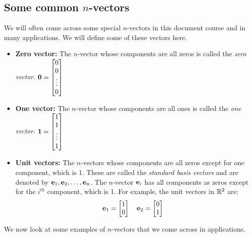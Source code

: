 \subsection{Some common $n$-vectors}
We will often come across some special $n$-vectors in this document course and in many applications. We will define some of these vectors here.
\begin{itemize}
    \item \textbf{Zero vector:} The $n$-vector whose components are all zeros is called the \textit{zero vector}. $\mf{0} = \bmxc 0 \\ 0 \\ \vdots \\ 0\emx$
    \item \textbf{One vector:} The $n$-vector whose components are all ones is called the \textit{one vector}. $\mf{1} = \bmxc 1 \\ 1 \\ \vdots \\ 1\emx$
    \item \textbf{Unit vectors:} The $n$-vectors whose components are all zeros except for one component, which is 1. These are called the \textit{standard basis vectors} and are denoted by $\mathbf{e}_1, \mathbf{e}_2, \ldots, \mathbf{e}_n$. The $n$-vector $\mathbf{e}_i$ has all components as zeros except for the $i^{th}$ component, which is 1. For example, the unit vectors in $\mathbb{R}^2$ are:
    \[ \mf{e}_1 = \bmx 1 \\ 0\emx \quad \mf{e}_2 = \bmx 0 \\ 1 \emx  \]
\end{itemize}

We now look at some examples of $n$-vectors that we come across in applications.

